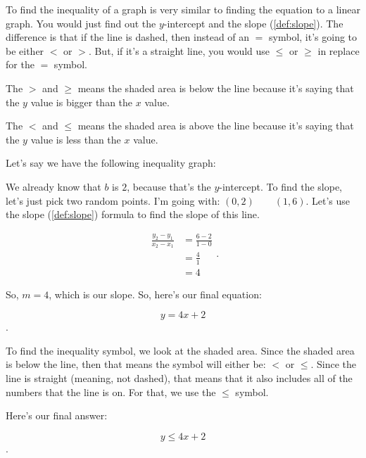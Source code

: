 \label{les_1_unit_2:write_an_inequality_from_graph}

To find the inequality of a graph is very similar to finding the equation to a
linear graph. You would just find out the $y$-intercept and the slope
(\ref{def:slope}). The difference is that if the line is dashed, then instead of
an $=$ symbol, it's going to be either $<$ or $>$. But, if it's a straight line,
you would use $\le$ or $\ge$ in replace for the $=$ symbol.

The $>$ and $\ge$ means the shaded area is below the line because it's saying
that the $y$ value is bigger than the $x$ value.

The $<$ and $\le$ means the shaded area is above the line because it's saying
that the $y$ value is less than the $x$ value.

\begin{example}
  \label{exm:write_an_inequality_from_graph}

  Let's say we have the following inequality graph:

  \begin{figure}[H]
    \centering
    \label{fig:write_an_inequality_from_graph}
  \end{figure}

  We already know that $b$ is $2$, because that's the $y$-intercept. To find the
  slope, let's just pick two random points. I'm going with:
  $(0,2) \qquad (1, 6)$. Let's use the slope (\ref{def:slope}) formula to find
  the slope of this line.

  \begin{equation}
    \label{eqt:using_slope_formula_to_find_slope_of_inequality_line}
    \begin{split}
      \frac{y_2 - y_1}{x_2 - x_1} &= \frac{6 - 2}{1 - 0} \\
                                  &= \frac{4}{1} \\
                                  &= 4
    \end{split}
  .\end{equation}

  So, $m = 4$, which is our slope. So, here's our final equation: 

  \[ y = 4x + 2 \].

  To find the inequality symbol, we look at the shaded area. Since the shaded
  area is below the line, then that means the symbol will either be: $<$ or
  $\le$. Since the line is straight (meaning, not dashed), that means that it
  also includes all of the numbers that the line is on. For that, we use the
  $\le$ symbol.

  Here's our final answer:

  \[ \boxed{y \le 4x + 2} \].
\end{example}

\newpage
